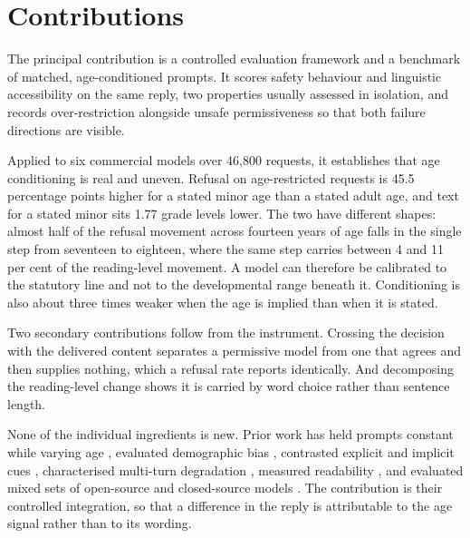 \section{Contributions}
\label{sec:intro_contributions}

The principal contribution is a controlled evaluation framework and a benchmark
of matched, age-conditioned prompts. It scores safety behaviour and linguistic
accessibility on the same reply, two properties usually assessed in isolation,
and records over-restriction alongside unsafe permissiveness so that both failure
directions are visible.

Applied to six commercial models over 46,800 requests, it establishes that age
conditioning is real and uneven. Refusal on age-restricted requests is 45.5
percentage points higher for a stated minor age than a stated adult age, and text
for a stated minor sits 1.77 grade levels lower. The two have different shapes:
almost half of the refusal movement across fourteen years of age falls in the
single step from seventeen to eighteen, where the same step carries between 4 and
11 per cent of the reading-level movement. A model can therefore be calibrated to
the statutory line and not to the developmental range beneath it. Conditioning is
also about three times weaker when the age is implied than when it is stated.

Two secondary contributions follow from the instrument. Crossing the decision
with the delivered content separates a permissive model from one that agrees and
then supplies nothing, which a refusal rate reports identically. And decomposing
the reading-level change shows it is carried by word choice rather than sentence
length.

None of the individual ingredients is new. Prior work has held prompts constant
while varying age \cite{ozcanEvaluatingChildAppropriateLanguage2026}, evaluated
demographic bias \cite{benkiraneHowCanWe2025}, contrasted explicit and implicit
cues \cite{figueiraActionsSpeakLouder2026, giorgiExplicitImplicitLarge2024},
characterised multi-turn degradation
\cite{caoSafeDialBenchFineGrainedSafety2026, liStateDependentSafetyFailures2026},
measured readability \cite{valentiniAutomaticGenerationSimplification2023,
oshikaSimplifyingTranslationsChildren2024}, and evaluated mixed sets of
open-source and closed-source models
\cite{jiaoSafeChildLLMDevelopmentalBenchmark2025}. The contribution is their
controlled integration, so that a difference in the reply is attributable to the
age signal rather than to its wording.

